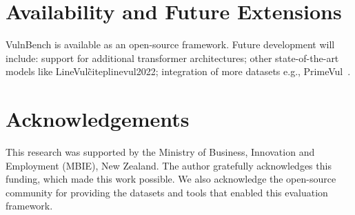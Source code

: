 \documentclass[letterpaper]{article}
\begin{document}
\section{Availability and Future Extensions}

VulnBench is available as an open-source framework. Future development will include: support for additional transformer architectures; other state-of-the-art models like LineVul\~citep{linevul2022}; integration of more datasets e.g., PrimeVul~\citep{ding2025vulnerability}.

\section*{Acknowledgements}
This research was supported by the Ministry of Business, Innovation and Employment (MBIE), New Zealand. The author gratefully acknowledges this funding, which made this work possible.
We also acknowledge the open-source community for providing the datasets and tools that enabled this evaluation framework.



\end{document}
